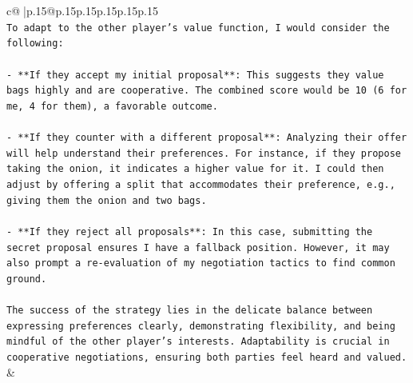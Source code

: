\documentclass{article}
\begin{document}
{\begin{supertabular}{c@{$\;$}|p{.15\linewidth}@{}p{.15\linewidth}p{.15\linewidth}p{.15\linewidth}p{.15\linewidth}p{.15\linewidth}}
{{{\\ 
\texttt{To adapt to the other player's value function, I would consider the following:} \\
\\ 
\texttt{{-} **If they accept my initial proposal**: This suggests they value bags highly and are cooperative. The combined score would be 10 (6 for me, 4 for them), a favorable outcome.} \\
\\ 
\texttt{{-} **If they counter with a different proposal**: Analyzing their offer will help understand their preferences. For instance, if they propose taking the onion, it indicates a higher value for it. I could then adjust by offering a split that accommodates their preference, e.g., giving them the onion and two bags.} \\
\\ 
\texttt{{-} **If they reject all proposals**: In this case, submitting the secret proposal ensures I have a fallback position. However, it may also prompt a re{-}evaluation of my negotiation tactics to find common ground.} \\
\\ 
\texttt{The success of the strategy lies in the delicate balance between expressing preferences clearly, demonstrating flexibility, and being mindful of the other player's interests. Adaptability is crucial in cooperative negotiations, ensuring both parties feel heard and valued.} \\
            }
        }
    }
    & \\ \\


\end{supertabular}}
\end{document}
